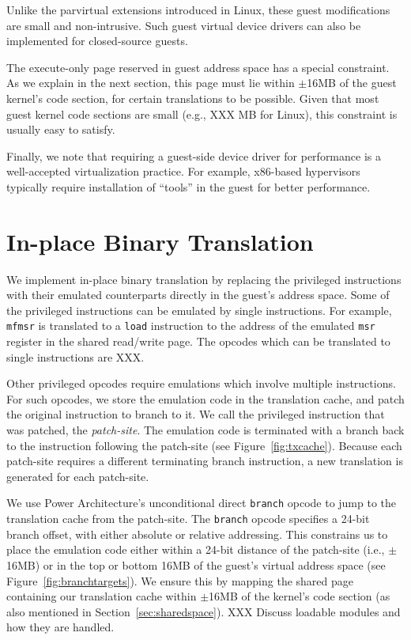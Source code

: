 \documentclass[10pt,twocolumn]{article}
\begin{document}
Unlike the parvirtual extensions introduced in Linux, these guest
modifications are small and non-intrusive. Such guest virtual device drivers
can also be implemented for closed-source guests.

The execute-only page reserved in guest address space has a special
constraint. As we explain in the
next section, this page must lie within $\pm$16MB of the
guest kernel's code section, for certain translations to be possible.
Given that most guest kernel code sections are
small (e.g., XXX MB for Linux), this constraint is usually easy to satisfy.

Finally, we note that requiring a guest-side device driver for performance
is a well-accepted virtualization practice. For example, x86-based hypervisors
typically require installation of ``tools'' in the guest for better performance.

\section{In-place Binary Translation}
\label{sec:bintrans}
We implement in-place binary translation by replacing the
privileged instructions
with their emulated counterparts directly
in the guest's address space. Some of the privileged instructions can
be emulated by single instructions. For example, {\tt mfmsr} is translated
to a {\tt load} instruction to the address of the emulated {\tt msr}
register in the shared read/write page. The opcodes which can be
translated to single instructions are XXX.

Other privileged opcodes require emulations which involve multiple instructions.
For such opcodes, we store the emulation code in the translation cache, and
patch the original instruction to branch to it. We call the privileged instruction
that was patched, the {\em patch-site}. The emulation code is terminated
with a branch back to the instruction following the patch-site
(see Figure~\ref{fig:txcache}). Because each patch-site requires a different
terminating branch instruction, a new translation is generated for
each patch-site.

We use Power Architecture's unconditional direct {\tt branch} opcode to jump to the
translation cache from the patch-site. The {\tt branch} opcode specifies a 24-bit
branch offset, with either absolute or relative addressing. This constrains us
to place the emulation code either within a 24-bit distance of the patch-site (i.e.,
$\pm$16MB) or in the top or bottom 16MB of the guest's virtual address
space (see Figure~\ref{fig:branchtargets}). We ensure this by mapping the shared
page containing our translation cache within $\pm$16MB of the kernel's code
section (as also mentioned in Section~\ref{sec:sharedspace}). XXX Discuss loadable
modules and how they are handled.
\end{document}
